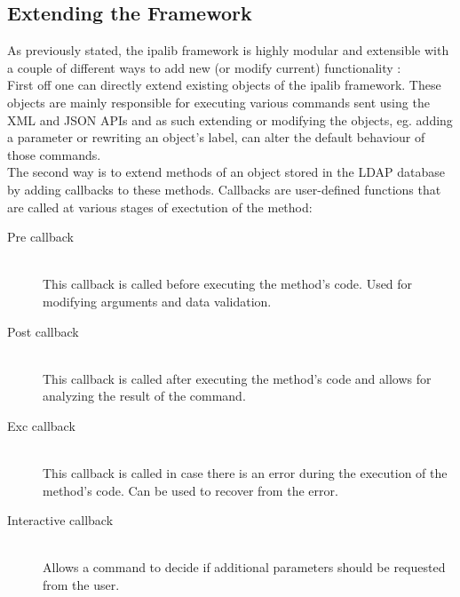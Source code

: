 \subsection{Extending the Framework}
As previously stated, the ipalib framework is highly modular and extensible with a couple of different ways to add new (or modify current) functionality \cite{extIpa}:\\
First off one can directly extend existing objects of the ipalib framework. These objects are mainly responsible for executing various commands sent using the XML and JSON APIs
and as such extending or modifying the objects, eg. adding a parameter or rewriting an object's label, can alter the default behaviour of those commands. \\
The second way is to extend methods of an object stored in the LDAP database by adding callbacks to these methods.
Callbacks are user-defined functions that are called at various stages of exectution of the method:
\begin{description}
    \item[Pre callback]\hfill \\This callback is called before executing the method's code. Used for modifying arguments and data validation.
    \item[Post callback]\hfill \\This callback is called after executing the method's code and allows for analyzing the result of the command.
    \item[Exc callback]\hfill \\This callback is called in case there is an error during the execution of the method's code. Can be used to recover from the error.
    \item[Interactive callback]\hfill \\Allows a command to decide if additional parameters should be requested from the user.
\end{description}
